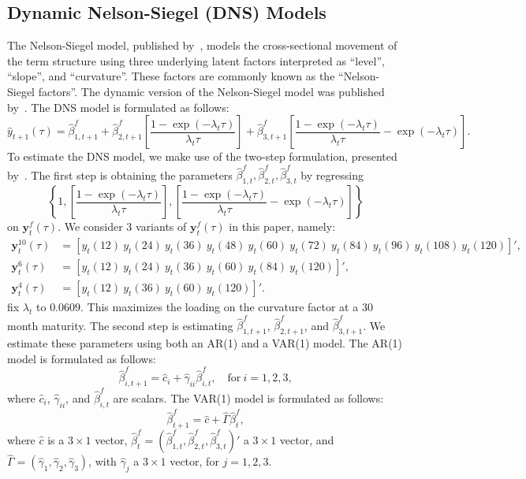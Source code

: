 \subsection{Dynamic Nelson-Siegel (DNS) Models}
\label{sec:dns}
The Nelson-Siegel model, published by~\textcite{nelson_parsimonious_1987}, models the cross-sectional movement of the term structure using three underlying latent factors interpreted as \enquote{level}, \enquote{slope}, and \enquote{curvature}. 
These factors are commonly known as the \enquote{Nelson-Siegel factors}. 
The dynamic version of the Nelson-Siegel model was published by~\textcite[hereafter DNS]{diebold_forecasting_2006}. 
The DNS model is formulated as follows:
\begin{equation}
	\hat{y}_{t+1}(\tau) = \hat{\beta}_{1,t+1}^{f} + \hat{\beta}_{2,t+1}^{f} \left[\frac{1-\exp(-\lambda_t \tau)}{\lambda_t \tau}\right] + \hat{\beta}_{3,t+1}^{f} \left[\frac{1-\exp(-\lambda_t \tau)}{\lambda_t \tau} - \exp(-\lambda_t \tau)\right].
\end{equation}
To estimate the DNS model, we make use of the two-step formulation, presented by~\textcite{diebold_forecasting_2006}. 
The first step is obtaining the parameters $\hat{\beta}_{1,t}^f, \hat{\beta}_{2,t}^f, \hat{\beta}_{3,t}^f$ by regressing $$\left\{1, \left[\frac{1-\exp(-\lambda_t \tau)}{\lambda_t \tau}\right], \left[\frac{1-\exp(-\lambda_t \tau)}{\lambda_t \tau} - \exp(-\lambda_t \tau)\right] \right\}$$ on $\mathbf{y}_t^f(\tau)$.
We consider 3 variants of $\mathbf{y}_t^f(\tau)$ in this paper, namely:
\begin{align*}
	\mathbf{y}_t^{10}(\tau) &= \left[y_t(12)~y_t(24)~y_t(36)~y_t(48)~y_t(60)~y_t(72)~y_t(84)~y_t(96)~y_t(108)~y_t(120) \right]', \\
	\mathbf{y}_t^6(\tau) &= \left[y_t(12)~y_t(24)~y_t(36)~y_t(60)~y_t(84)~y_t(120) \right]', \\
	\mathbf{y}_t^4(\tau) &= \left[y_t(12)~y_t(36)~y_t(60)~y_t(120) \right]'.
\end{align*}
\textcite{diebold_forecasting_2006} fix $\lambda_t$ to $0.0609$.
This maximizes the loading on the curvature factor at a 30 month maturity. 
The second step is estimating $\hat{\beta}_{1,t+1}^{f}$, $\hat{\beta}_{2,t+1}^{f}$, and $\hat{\beta}_{3,t+1}^{f}$.
We estimate these parameters using both an AR(1) and a VAR(1) model. 
The AR(1) model is formulated as follows:
\begin{equation}
\label{eq:dnsar}
	\hat{\beta}_{i,t+1}^{f} = \hat{c}_i + \hat{\gamma}_{ii} \hat{\beta}_{i,t}^f, \quad \text{for}~i = 1,2,3,
\end{equation}
where $\hat{c}_i$, $\hat{\gamma}_{ii}$, and $\hat{\beta}_{i,t}^f$ are scalars. 
The VAR(1) model is formulated as follows:
\begin{equation}
\label{eq:dnsvar}
	\hat{\beta}_{t+1}^{f} = \hat{c} + \hat{\Gamma} \hat{\beta}_t^f,
\end{equation}
where $\hat{c}$ is a $3 \times 1$ vector, $\hat{\beta}_t^f = \left(\hat{\beta}_{1,t}^f, \hat{\beta}_{2,t}^f, \hat{\beta}_{3,t}^f\right)'$ a $3 \times 1$ vector, and $\hat{\Gamma} = \left(\hat{\gamma}_1, \hat{\gamma}_2, \hat{\gamma}_3 \right)$, with $\hat{\gamma}_j$ a $3 \times 1$ vector, for $j = 1,2,3$. 

